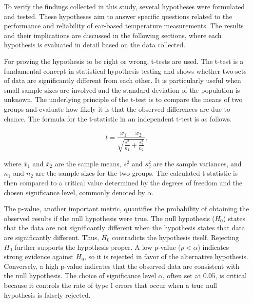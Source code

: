 To verify the findings collected in this study, several hypotheses were formulated and tested. 
These hypotheses aim to answer specific questions related to the performance and reliability of ear-based temperature measurements. 
The results and their implications are discussed in the following sections, where each hypothesis is evaluated in detail based on the data collected.

For proving the hypothesis to be right or wrong, t-tests are used.
The t-test is a fundamental concept in statistical hypothesis testing and shows whether two sets of data are significantly different from each other. 
It is particularly useful when small sample sizes are involved and the standard deviation of the population is unknown.
The underlying principle of the t-test is to compare the means of two groups and evaluate how likely it is that the observed differences are due to chance.
The formula for the t-statistic in an independent t-test is as follows.

\[
t = \frac{{\bar{x}_1 - \bar{x}_2}}{\sqrt{\frac{{s_1^2}}{n_1} + \frac{{s_2^2}}{n_2}}},
\]

where \( \bar{x}_1 \) and \( \bar{x}_2 \) are the sample means, \( s_1^2 \) and \( s_2^2 \) are the sample variances, and \( n_1 \) and \( n_2 \) are the sample sizes for the two groups.
The calculated t-statistic is then compared to a critical value determined by the degrees of freedom and the chosen significance level, commonly denoted by \( \alpha \).

The p-value, another important metric, quantifies the probability of obtaining the observed results if the null hypothesis were true.
The null hypothesis ($H_0$) states that the data are not significantly different when the hypothesis states that data are significantly different.
Thus, $H_0$ contradicts the hypothesis itself.
Rejecting $H_0$ further supports the hypothesis proper.
A low p-value (\( p < \alpha \)) indicates strong evidence against $H_0$, so it is rejected in favor of the alternative hypothesis.
Conversely, a high p-value indicates that the observed data are consistent with the null hypothesis.
The choice of significance level \( \alpha \), often set at 0.05, is critical because it controls the rate of type I errors that occur when a true null hypothesis is falsely rejected.

